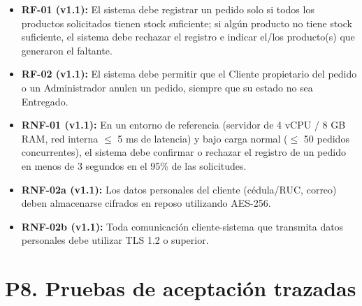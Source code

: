 \documentclass[12pt,a4paper]{article}
\begin{document}
    \begin{itemize}[leftmargin=*]
        \item \textbf{RF-01 (v1.1):} El sistema debe registrar un pedido solo si todos los productos solicitados tienen stock suficiente; si algún producto no tiene stock suficiente, el sistema debe rechazar el registro e indicar el/los producto(s) que generaron el faltante.
        \item \textbf{RF-02 (v1.1):} El sistema debe permitir que el Cliente propietario del pedido o un Administrador anulen un pedido, siempre que su estado no sea Entregado.
        \item \textbf{RNF-01 (v1.1):} En un entorno de referencia (servidor de 4 vCPU / 8 GB RAM, red interna $\leq$ 5 ms de latencia) y bajo carga normal ($\leq$ 50 pedidos concurrentes), el sistema debe confirmar o rechazar el registro de un pedido en menos de 3 segundos en el 95\% de las solicitudes.
        \item \textbf{RNF-02a (v1.1):} Los datos personales del cliente (cédula/RUC, correo) deben almacenarse cifrados en reposo utilizando AES-256.
        \item \textbf{RNF-02b (v1.1):} Toda comunicación cliente-sistema que transmita datos personales debe utilizar TLS 1.2 o superior.
    \end{itemize}
    
    \section{P8. Pruebas de aceptación trazadas}
    
\end{document}
